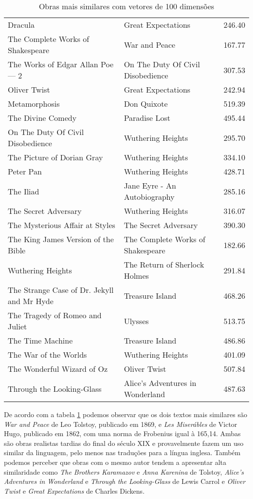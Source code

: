 \documentclass{article}
\begin{document}
\begin{table}[h]
\begin{center}
\begin{tabular}{ | l | l | l |}
    Dracula & Great Expectations & 246.40 \\
    The Complete Works of Shakespeare & War and Peace & 167.77 \\
    The Works of Edgar Allan Poe — 2 & On The Duty Of Civil Disobedience & 307.53 \\
    Oliver Twist & Great Expectations & 242.94 \\
    Metamorphosis & Don Quixote & 519.39 \\
    The Divine Comedy & Paradise Lost & 495.44 \\
    On The Duty Of Civil Disobedience & Wuthering Heights & 295.70 \\
    The Picture of Dorian Gray & Wuthering Heights & 334.10 \\
    Peter Pan & Wuthering Heights & 428.71 \\
    The Iliad & Jane Eyre - An Autobiography & 285.16 \\
    The Secret Adversary & Wuthering Heights & 316.07 \\
    The Mysterious Affair at Styles & The Secret Adversary & 390.30 \\
    The King James Version of the Bible & The Complete Works of Shakespeare & 182.66 \\
    Wuthering Heights & The Return of Sherlock Holmes & 291.84 \\
    The Strange Case of Dr. Jekyll and Mr Hyde & Treasure Island & 468.26 \\
    The Tragedy of Romeo and Juliet & Ulysses & 513.75 \\
    The Time Machine & Treasure Island & 486.86 \\
    The War of the Worlds & Wuthering Heights & 401.09 \\
    The Wonderful Wizard of Oz & Oliver Twist & 507.84 \\
    Through the Looking-Glass & Alice's Adventures in Wonderland & 487.63 \\
    \hline
    \end{tabular}
    \caption{Obras mais similares com vetores de 100 dimensões} 
    \label{tab:most_similar_100}
  \end{center}
\end{table}

De acordo com a tabela \ref{tab:most_similar_100} podemos observar que os dois textos mais similares 
são \textit{War and Peace} de Leo Tolstoy, publicado em 1869, e \textit{Les Miserábles} de Victor Hugo, publicado em 1862, 
com uma norma de Frobenius igual à 165,14. Ambas são obras realistas tardias do final do século XIX e
provavelmente fazem um uso similar da linguagem, pelo menos nas traduções para a língua inglesa. Também
podemos perceber que obras com o mesmo autor tendem a apresentar alta similaridade como \textit{The Brothers Karamazov}
e \textit{Anna Karenina} de Tolstoy, \textit{Alice's Adventures in Wonderland} e \textit{Through the Looking-Glass} de Lewis Carrol e 
\textit{Oliver Twist} e \textit{Great Expectations} de Charles Dickens. 
\end{document}
